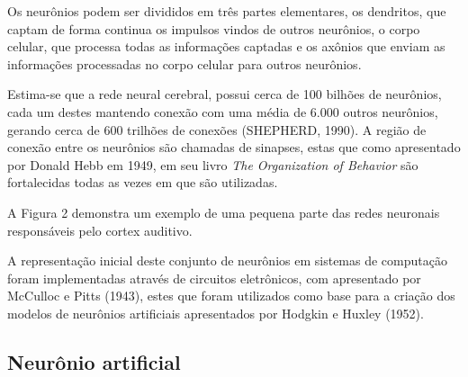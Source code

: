 Os neurônios podem ser divididos em três partes elementares, os dendritos, que captam de forma continua os impulsos vindos de outros neurônios, o corpo celular, que processa todas as informações captadas e os axônios que enviam as informações processadas no corpo celular para outros neurônios.


Estima-se que a rede neural cerebral, possui cerca de 100 bilhões de neurônios, cada um destes mantendo conexão com uma média de 6.000 outros neurônios, gerando cerca de 600 trilhões de conexões (SHEPHERD, 1990). A região de conexão entre os neurônios são chamadas de sinapses, estas que como apresentado por Donald Hebb em 1949, em seu livro \textit{The Organization of Behavior} são fortalecidas todas as vezes em que são utilizadas.


A Figura 2 demonstra um exemplo de uma pequena parte das redes neuronais responsáveis pelo cortex auditivo.



A representação inicial deste conjunto de neurônios em sistemas de computação foram implementadas através de circuitos eletrônicos, com apresentado por McCulloc e Pitts (1943), estes que foram utilizados como base para a criação dos modelos de neurônios artificiais apresentados por Hodgkin e Huxley (1952).

\subsection{Neurônio artificial}

